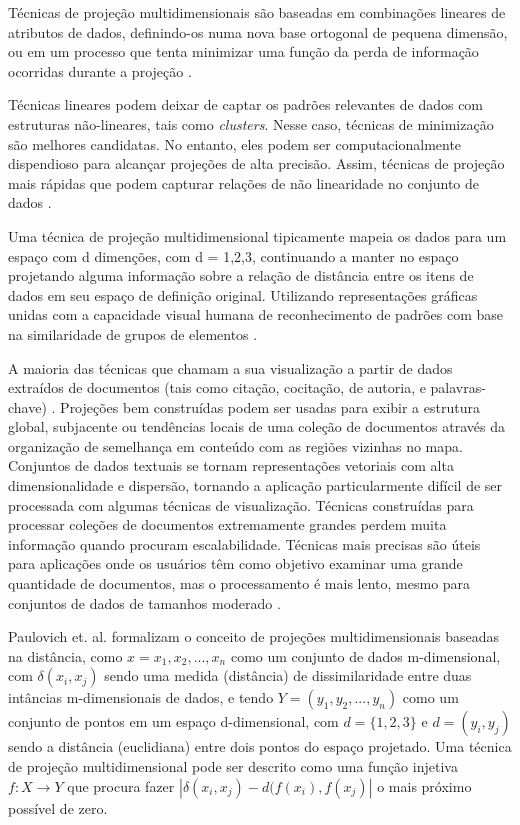 Técnicas de projeção multidimensionais são baseadas em combinações lineares de atributos de dados, definindo-os numa nova base ortogonal de pequena dimensão, ou em um processo que tenta minimizar uma função da perda de informação ocorridas durante a projeção \cite{spence2001information}. 

Técnicas lineares podem deixar de captar os padrões relevantes de dados com estruturas não-lineares, tais como \textit{clusters}. Nesse caso, técnicas de minimização são melhores candidatas. No entanto, eles podem ser computacionalmente dispendioso para alcançar projeções de alta precisão. Assim, técnicas de projeção mais rápidas que podem capturar relações de não linearidade no conjunto de dados \cite{dzemyda2013multidimensional} \cite{zhu2013data}.

Uma técnica de projeção multidimensional tipicamente mapeia os dados para um espaço com d dimenções, com d = {1,2,3}, continuando a manter no espaço projetando alguma informação sobre a relação de distância entre os itens de dados em seu espaço de definição original. Utilizando representações gráficas unidas com a capacidade visual humana de reconhecimento de padrões com base na similaridade de grupos de elementos \cite{paulovich2008least}.

A maioria das técnicas  que chamam a sua visualização a partir de dados extraídos de documentos (tais como citação, cocitação, de autoria, e palavras-chave) \cite{vaz2004visualizacao}. Projeções bem construídas podem ser usadas para exibir a estrutura global, subjacente ou tendências locais de uma coleção de documentos através da organização de semelhança em conteúdo com as regiões vizinhas no mapa. Conjuntos de dados textuais se tornam representações vetoriais com alta dimensionalidade e dispersão, tornando a aplicação particularmente difícil de ser processada com algumas técnicas de visualização. 
Técnicas construídas para processar coleções de documentos extremamente grandes perdem muita informação quando procuram escalabilidade. Técnicas mais precisas são úteis para aplicações onde os usuários têm como objetivo examinar uma grande quantidade de documentos, mas o processamento é mais lento, mesmo para conjuntos de dados de tamanhos moderado \cite{ward2015interactive}.


Paulovich et. al. \cite{paulovich2008least} formalizam o conceito de projeções multidimensionais baseadas na distância, como $x={x_{1}, x_{2},...,x_{n}}$ como um conjunto de dados m-dimensional, com $\delta (x_{i},x_{j})$ sendo uma medida (distância) de dissimilaridade entre duas intâncias m-dimensionais de dados, e tendo $Y=(y_{1},y_{2},...,y_{n})$ como um conjunto de pontos em um espaço d-dimensional, com $d=\{1,2,3\}$ e $d=(y_{i},y_{j})$ sendo a distância (euclidiana) entre dois pontos do espaço projetado. Uma técnica de projeção multidimensional pode ser descrito como uma função injetiva $f : X\rightarrow Y$ que procura fazer $|\delta (x_{i}, x_{j})-d(f(x_{i}),f(x_{j})|$ o mais próximo possível de zero.

